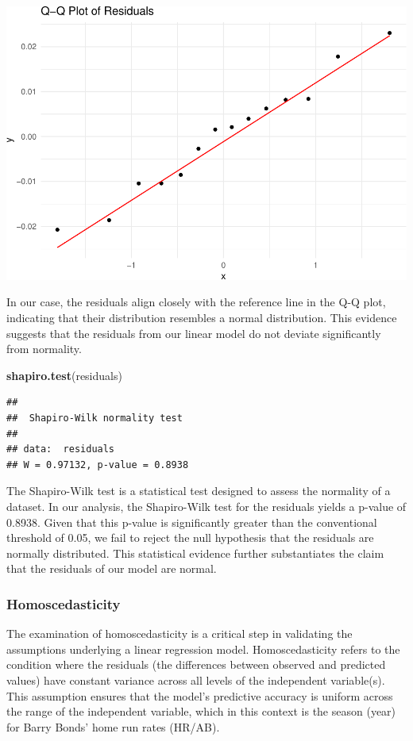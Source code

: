 \documentclass[
]{article}
\newenvironment{Shaded}{\begin{snugshade}}{\end{snugshade}}
\newcommand{\FunctionTok}[1]{\textcolor[rgb]{0.13,0.29,0.53}{\textbf{#1}}}
\newcommand{\NormalTok}[1]{#1}
\begin{document}
\includegraphics{602_project_files/figure-latex/unnamed-chunk-7-1.pdf}

In our case, the residuals align closely with the reference line in the
Q-Q plot, indicating that their distribution resembles a normal
distribution. This evidence suggests that the residuals from our linear
model do not deviate significantly from normality.

\begin{Shaded}
\begin{Highlighting}[]
\FunctionTok{shapiro.test}\NormalTok{(residuals)}
\end{Highlighting}
\end{Shaded}

\begin{verbatim}
## 
##  Shapiro-Wilk normality test
## 
## data:  residuals
## W = 0.97132, p-value = 0.8938
\end{verbatim}

The Shapiro-Wilk test is a statistical test designed to assess the
normality of a dataset. In our analysis, the Shapiro-Wilk test for the
residuals yields a p-value of 0.8938. Given that this p-value is
significantly greater than the conventional threshold of 0.05, we fail
to reject the null hypothesis that the residuals are normally
distributed. This statistical evidence further substantiates the claim
that the residuals of our model are normal.

\subsubsection{Homoscedasticity}\label{homoscedasticity}

The examination of homoscedasticity is a critical step in validating the
assumptions underlying a linear regression model. Homoscedasticity
refers to the condition where the residuals (the differences between
observed and predicted values) have constant variance across all levels
of the independent variable(s). This assumption ensures that the model's
predictive accuracy is uniform across the range of the independent
variable, which in this context is the season (year) for Barry Bonds'
home run rates (HR/AB).
\end{document}
